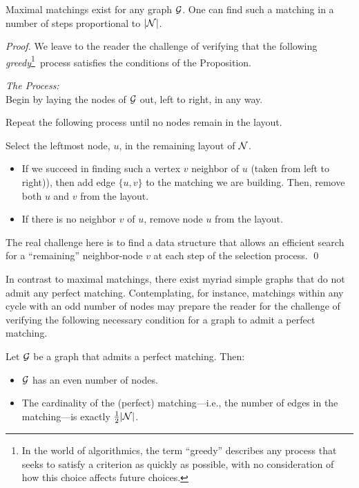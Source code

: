 \begin{prop}
\label{thm:max-matching}
Maximal matchings exist for any graph $\mbox{$\cal G$}$.  One can find such a
matching in a number of steps proportional to $|\mbox{$\cal N$}|$.
\end{prop}

\begin{proof}
We leave to the reader the challenge of verifying that the following
 {\em greedy}\footnote{In the world of
  algorithmics, the term ``greedy'' describes any process that seeks to
  satisfy a criterion as quickly as possible, with no consideration of
  how this choice affects future choices.}~process satisfies the
conditions of the Proposition.
\medskip

\noindent
{\it The Process:} \\
Begin by laying the nodes of $\mbox{$\cal G$}$ out, left to right, in any way.

\noindent
Repeat the following process until no nodes remain in the layout.

\noindent
Select the leftmost node, $u$, in the remaining layout of $\mbox{$\cal N$}$.
  \begin{itemize}
  \item
If we succeed in finding such a vertex $v$ neighbor of $u$ (taken from left to right)), 
then add edge $\{u,v\}$ to
the matching we are building.  
Then, remove both $u$ and $v$ from the layout.
  \item
If there is no neighbor $v$ of $u$, remove node $u$ from the layout.
  \end{itemize}
The real challenge here is to find a data structure that allows an
efficient search for a ``remaining'' neighbor-node $v$ at each step of
the selection process.
\qed
\end{proof}

\medskip

In contrast to maximal matchings, there exist myriad simple graphs
that do not admit any perfect matching.  Contemplating, for instance,
matchings within any cycle with an odd number of nodes may prepare the
reader for the challenge of verifying the following necessary
condition for a graph to admit a perfect matching.

\begin{prop}
\label{thm:necessary-for-perfect-matching}
Let $\mbox{$\cal G$}$ be a graph that admits a perfect matching.  Then:
\begin{itemize}
\item
$\mbox{$\cal G$}$ has an even number of nodes.
\item
The cardinality of the (perfect) matching---i.e., the number of edges
in the matching---is exactly
$\frac{1}{2}|\mbox{$\cal N$}|$.
\end{itemize}
\end{prop}


